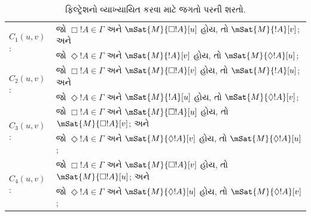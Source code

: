 
\begin{table}[ht]
  \centering
  \begin{tabular}{|ll|}
    \hline
    \multirow{2}{*}{$C_1(u,v)$:}
    &
      જો $\Box!A \in \Gamma$ અને $\mSat{M}{\Box!A}[u]$ હોય,
      તો $\mSat{M}{!A}[v]$; અને\\
    &
      જો $\Diamond!A \in \Gamma$ અને $\mSat{M}{!A}[v]$ હોય,
      તો $\mSat{M}{\Diamond!A}[u]$; \\
    \hline
    \multirow{2}{*}{$C_2(u,v)$:}
    &
      જો $\Box!A \in \Gamma$ અને $\mSat{M}{\Box!A}[v]$ હોય,
      તો $\mSat{M}{!A}[u]$; અને\\
    &
      જો $\Diamond!A \in \Gamma$ અને $\mSat{M}{!A}[u]$ હોય,
      તો $\mSat{M}{\Diamond!A}[v]$; \\
    \hline
    \multirow{2}{*}{$C_3(u,v)$:}
    &
      જો $\Box!A \in \Gamma$ અને $\mSat{M}{\Box!A}[u]$ હોય,
      તો $\mSat{M}{\Box!A}[v]$; અને\\
    &
      જો $\Diamond!A \in \Gamma$ અને $\mSat{M}{\Diamond!A}[v]$ હોય,
      તો $\mSat{M}{\Diamond!A}[u]$; \\
    \hline
    \multirow{2}{*}{$C_4(u,v)$:}
    &
      જો $\Box!A \in \Gamma$ અને $\mSat{M}{\Box!A}[v]$ હોય,
      તો $\mSat{M}{\Box!A}[u]$; અને\\
    &
      જો $\Diamond!A \in \Gamma$ અને $\mSat{M}{\Diamond!A}[u]$ હોય,
      તો $\mSat{M}{\Diamond!A}[v]$; \\
    \hline
    \end{tabular}
  \caption{ફિલ્ટ્રેશનો વ્યાખ્યાયિત કરવા માટે જગતો પરની શરતો.}
\end{table}


